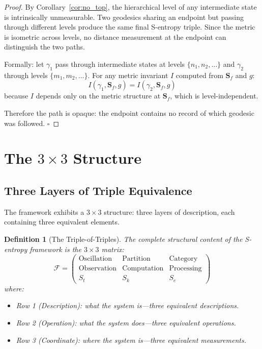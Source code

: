 \documentclass[12pt,twocolumn]{article}
\newtheorem{definition}{Definition}[section]
\begin{document}
\begin{proof}
By Corollary~\ref{cor:no_top}, the hierarchical level of any intermediate state is intrinsically unmeasurable. Two geodesics sharing an endpoint but passing through different levels produce the same final S-entropy triple. Since the metric is isometric across levels, no distance measurement at the endpoint can distinguish the two paths.

Formally: let $\gamma_1$ pass through intermediate states at levels $\{n_1, n_2, \ldots\}$ and $\gamma_2$ through levels $\{m_1, m_2, \ldots\}$. For any metric invariant $I$ computed from $\mathbf{S}_f$ and $g$:
\begin{equation}
I(\gamma_1, \mathbf{S}_f, g) = I(\gamma_2, \mathbf{S}_f, g)
\end{equation}
because $I$ depends only on the metric structure at $\mathbf{S}_f$, which is level-independent.

Therefore the path is opaque: the endpoint contains no record of which geodesic was followed. $\square$
\end{proof}


\section{The $3 \times 3$ Structure}
\label{sec:3x3}

\subsection{Three Layers of Triple Equivalence}

The framework exhibits a $3 \times 3$ structure: three layers of description, each containing three equivalent elements.

\begin{definition}[The Triple-of-Triples]
\label{def:triple_of_triples}
The complete structural content of the S-entropy framework is the $3 \times 3$ matrix:
\begin{equation}
\label{eq:3x3}
\mathcal{F} = \begin{pmatrix}
\text{Oscillation} & \text{Partition} & \text{Category} \\
\text{Observation} & \text{Computation} & \text{Processing} \\
S_t & S_k & S_e
\end{pmatrix}
\end{equation}
where:
\begin{itemize}
\item Row 1 (Description): what the system \emph{is}---three equivalent descriptions.
\item Row 2 (Operation): what the system \emph{does}---three equivalent operations.
\item Row 3 (Coordinate): where the system \emph{is}---three equivalent measurements.
\end{itemize}
\end{definition}
\end{document}
